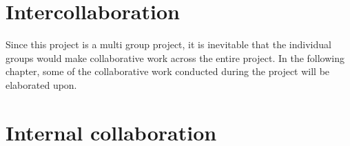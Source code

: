 \chapter{Intercollaboration}\label{CAP:Intercollaboration}
Since this project is a multi group project, it is inevitable that the individual groups would make collaborative work across the entire project. 
In the following chapter, some of the collaborative work conducted during the project will be elaborated upon. 



\chapter{Internal collaboration}\label{CAP:InternalCollaboration}

